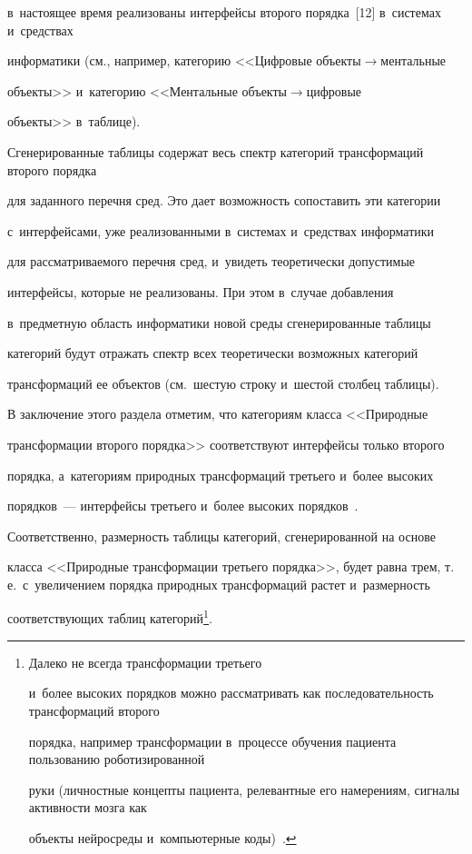 в~настоящее время реализованы интерфейсы второго порядка~[12] в~системах и~средствах 

информатики (см., например, категорию <<Цифровые об\-ъек\-ты\;$\to$\;мен\-таль\-ные 

объекты>> и~категорию <<Ментальные объ\-ек\-ты\;$\to$\;циф\-ро\-вые 

объекты>> в~таблице). 

  

  Сгенерированные таблицы содержат весь спектр категорий трансформаций второго порядка

для заданного перечня сред. Это дает возможность сопоставить эти категории 

с~интерфейсами, уже реализованными в~сис\-те\-мах и~средствах информатики 

для рассматриваемого перечня сред, и~увидеть теоретически до\-пус\-ти\-мые 

интерфейсы, которые не реализованы. При этом в~случае добавления 

в~предметную область информатики новой среды сгенерированные таб\-ли\-цы 

категорий будут отражать спектр всех теоретически возможных категорий 

трансформаций ее объектов (см.\ шестую строку и~шестой столбец таблицы).

  

  В заключение этого раздела отметим, что категориям класса <<Природные 

трансформации второго порядка>> соответствуют интерфейсы только второго 

порядка, а~категориям природных трансформаций третьего и~более высоких 

порядков~--- интерфейсы третьего и~более высоких порядков~\cite{12-zac}. 

Соответственно, размерность таблицы категорий, сгенерированной на основе 

класса <<Природные трансформации третьего порядка>>, будет равна трем, т.\,е.\ с~увеличением порядка природных трансформаций растет и~размерность 

соответствующих таблиц категорий\footnote{Далеко не всегда трансформации третьего 

и~более высоких порядков можно рассматривать как последовательность трансформаций второго 

порядка, например трансформации в~процессе обучения пациента пользованию роботизированной 

руки (личностные концепты пациента, релевантные его намерениям, сигналы активности мозга как 

объекты нейросреды и~компьютерные коды)~\cite{12-zac}.}.








